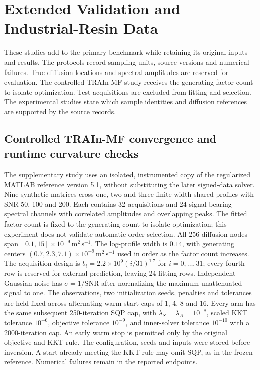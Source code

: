 \section{Extended Validation and Industrial-Resin Data}\label{app:completevalidation}
These studies add to the primary benchmark while retaining its original inputs
and results. The protocols record sampling units, source versions and numerical
failures. True diffusion locations and spectral amplitudes are reserved for
evaluation. The controlled TRAIn-MF study receives the generating factor count
to isolate optimization. Test acquisitions are excluded from fitting and
selection. The experimental studies state which
sample identities and diffusion references are supported by the source records.


\subsection{Controlled TRAIn-MF convergence and runtime curvature checks}\label{app:mfconvergence}
The supplementary study uses an isolated, instrumented copy of the regularized
MATLAB reference version 5.1, without substituting the later signed-data solver.
Nine synthetic matrices cross one, two and three finite-width shared profiles
with SNR 50, 100 and 200. Each contains 32 acquisitions and 24 signal-bearing
spectral channels with correlated amplitudes and overlapping peaks. The fitted
factor count is fixed to the generating count to isolate optimization; this
experiment does not validate automatic order selection. All 256 diffusion
nodes span $[0.1,15]\times10^{-9}\,\mathrm{m^2\,s^{-1}}$. The log-profile width is
$0.14$, with generating centers $(0.7,2.3,7.1)\times10^{-9}\,\mathrm{m^2\,s^{-1}}$
used in order as the factor count increases. The acquisition design is
$b_i=2.2\times10^9(i/31)^{1.7}$ for $i=0,\ldots,31$; every fourth row is reserved
for external prediction, leaving 24 fitting rows. Independent Gaussian noise
has $\sigma=1/\mathrm{SNR}$ after normalizing the maximum unattenuated signal to one.
The observations, two initialization seeds, penalties and tolerances are
held fixed across alternating warm-start caps of 1, 4, 8 and 16. Every arm has
the same subsequent 250-iteration SQP cap, with $\lambda_S=\lambda_A=10^{-8}$,
scaled KKT tolerance $10^{-6}$, objective tolerance $10^{-9}$, and inner-solver
tolerance $10^{-10}$ with a 2000-iteration cap. An early warm stop is permitted only
by the original objective-and-KKT rule. The configuration, seeds and inputs were
stored before inversion. A start already meeting the KKT rule may omit SQP,
as in the frozen reference. Numerical failures remain in the reported endpoints.

